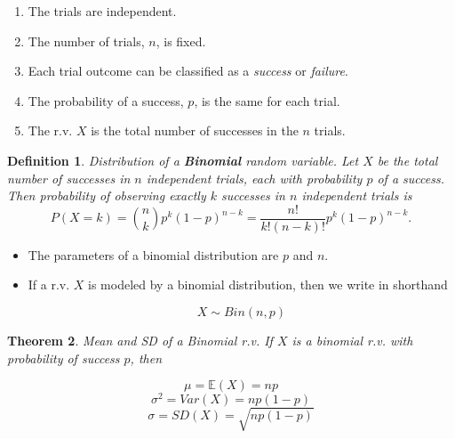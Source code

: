 \documentclass[12pt]{amsart}
\newtheorem{theorem}{Theorem}[section]
\newtheorem{definition}[theorem]{Definition}
\begin{document}
{\vspace{0.5cm}
\begin{enumerate}
\item The trials are independent.
\item The number of trials, $n$, is fixed. 
\item Each trial outcome can be classified as a \emph{success} or \emph{failure}.
\item The probability of a success, $p$, is the same for each trial.
\item The r.v. $X$ is the total number of successes in the $n$ trials.
\end{enumerate}



\vspace{.5cm}

\begin{definition}{Distribution of a \textbf{Binomial} random variable.} \newline
Let $X$ be the total number of successes in $n$ independent trials, each with probability $p$ of a success. \newline
Then probability of observing exactly $k$ successes in $n$ independent trials is 
\color{blue}
$$
P(X = k) = {n\choose k}p^k(1-p)^{n-k} = \frac{n!}{k!(n-k)!}p^k(1-p)^{n-k}.
\label{binomialFormula}
$$
\color{black}
\vspace{1cm}
\end{definition}


\begin{itemize}
\item The parameters of a binomial distribution are $p$ and $n$. 
\item If a r.v. $X$ is modeled by a binomial distribution, then we write in shorthand

\color{blue}
$$X\sim Bin(n,p)$$
\color{black}
\end{itemize}



\newpage
\begin{theorem}{Mean and SD of a Binomial r.v.} \newline
If $X$ is a binomial r.v. with probability of success $p$, then 

\color{blue}
$$\mu = \mathbb{E}(X) = np$$
$$\sigma^2= Var(X) = np(1-p)$$
$$\sigma = SD(X) =  \sqrt{np(1-p)}$$
\color{black}
\vspace{1cm}



\end{theorem}}
\end{document}
